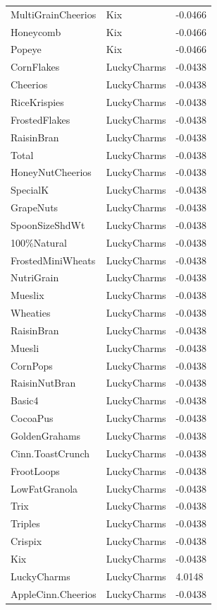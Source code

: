 \begin{table}[!htbp]
\begin{tabular}{lll}
MultiGrainCheerios & Kix & -0.0466
\\
Honeycomb & Kix & -0.0466
\\
Popeye & Kix & -0.0466
\\
CornFlakes & LuckyCharms & -0.0438
\\
Cheerios & LuckyCharms & -0.0438
\\
RiceKrispies & LuckyCharms & -0.0438
\\
FrostedFlakes & LuckyCharms & -0.0438
\\
RaisinBran & LuckyCharms & -0.0438
\\
Total & LuckyCharms & -0.0438
\\
HoneyNutCheerios & LuckyCharms & -0.0438
\\
SpecialK & LuckyCharms & -0.0438
\\
GrapeNuts & LuckyCharms & -0.0438
\\
SpoonSizeShdWt & LuckyCharms & -0.0438
\\
100\%Natural & LuckyCharms & -0.0438
\\
FrostedMiniWheats & LuckyCharms & -0.0438
\\
NutriGrain & LuckyCharms & -0.0438
\\
Mueslix & LuckyCharms & -0.0438
\\
Wheaties & LuckyCharms & -0.0438
\\
RaisinBran & LuckyCharms & -0.0438
\\
Muesli & LuckyCharms & -0.0438
\\
CornPops & LuckyCharms & -0.0438
\\
RaisinNutBran & LuckyCharms & -0.0438
\\
Basic4 & LuckyCharms & -0.0438
\\
CocoaPus & LuckyCharms & -0.0438
\\
GoldenGrahams & LuckyCharms & -0.0438
\\
Cinn.ToastCrunch & LuckyCharms & -0.0438
\\
FrootLoops & LuckyCharms & -0.0438
\\
LowFatGranola & LuckyCharms & -0.0438
\\
Trix & LuckyCharms & -0.0438
\\
Triples & LuckyCharms & -0.0438
\\
Crispix & LuckyCharms & -0.0438
\\
Kix & LuckyCharms & -0.0438
\\
LuckyCharms & LuckyCharms & 4.0148
\\
AppleCinn.Cheerios & LuckyCharms & -0.0438
\\

\end{tabular}
\end{table}

